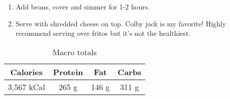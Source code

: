 \documentclass{report}
\begin{document}
\begin{multicols}{2}
\begin{enumerate}
\item Add beans, cover and simmer for 1-2 hours. 

\item Serve with shredded cheese on top. Colby jack is my favorite! Highly recommend serving over fritos but it's not the healthiest. 
\end{enumerate}

\begin{table}[H]
  \begin{center}
    \caption{Macro totals}
    \label{tab:table1}
    \begin{tabular}{c|c|c|c} %
      \textbf{Calories} & \textbf{Protein} & \textbf{Fat} & \textbf{Carbs}\\
      \hline
      3,567 kCal & 265 g & 146 g & 311 g\\
    \end{tabular}
  \end{center}
\end{table}
\end{multicols}




\end{document}
